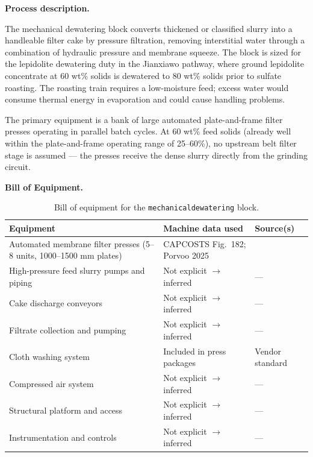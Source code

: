 \documentclass{article}
\renewcommand\_{\textunderscore\allowbreak}
\begin{document}
\medskip
\noindent\textbf{Process description.}\quad

The mechanical dewatering block converts thickened or classified slurry into a handleable filter cake by pressure filtration, removing interstitial water through a combination of hydraulic pressure and membrane squeeze. The block is sized for the lepidolite dewatering duty in the Jianxiawo pathway, where ground lepidolite concentrate at 60 wt\% solids is dewatered to 80 wt\% solids prior to sulfate roasting. The roasting train requires a low-moisture feed; excess water would consume thermal energy in evaporation and could cause handling problems.

The primary equipment is a bank of large automated plate-and-frame filter presses operating in parallel batch cycles. At 60 wt\% feed solids (already well within the plate-and-frame operating range of 25--60\%), no upstream belt filter stage is assumed --- the presses receive the dense slurry directly from the grinding circuit.

\medskip
\noindent\textbf{Bill of Equipment.}\quad

\begin{table}[h!]
\caption{Bill of equipment for the \texttt{mechanical\_dewatering} block.}
\centering
\begin{tabular}{>{\raggedright\arraybackslash}p{5.2cm}
				>{\raggedright\arraybackslash}p{4cm}
				>{\raggedright\arraybackslash}p{4.5cm}}
\toprule
\textbf{Equipment} & \textbf{Machine data used} & \textbf{Source(s)} \\
\midrule
Automated membrane filter presses (5--8 units, 1000--1500 mm plates) & CAPCOSTS Fig.~182; Porvoo 2025 & \citet{mularCAPCOSTSHandbookEstimating1998, porvooIndustrialFilterPress2025} \\
High-pressure feed slurry pumps and piping & Not explicit $\rightarrow$ inferred & --- \\
Cake discharge conveyors & Not explicit $\rightarrow$ inferred & --- \\
Filtrate collection and pumping & Not explicit $\rightarrow$ inferred & --- \\
Cloth washing system & Included in press packages & Vendor standard \\
Compressed air system & Not explicit $\rightarrow$ inferred & --- \\
Structural platform and access & Not explicit $\rightarrow$ inferred & --- \\
Instrumentation and controls & Not explicit $\rightarrow$ inferred & --- \\
\bottomrule
\end{tabular}
\end{table}
\end{document}
